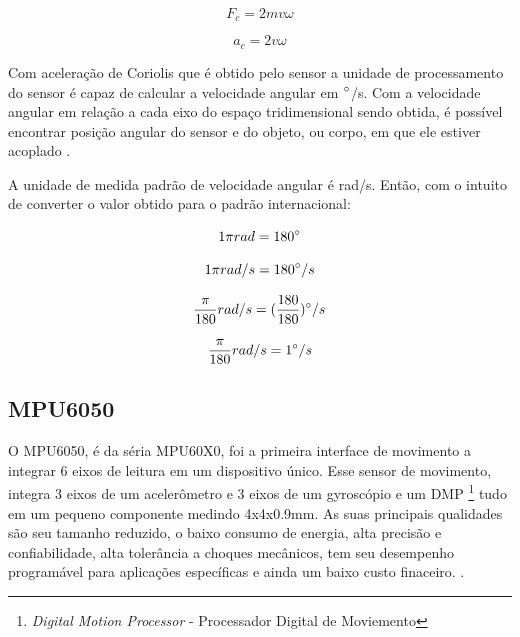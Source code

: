 			\begin{equation}
			F_{c} = 2mv\omega
			\end{equation}
			
			\begin{equation}
			a_{c} = 2v\omega
			\end{equation}
			
			Com aceleração de Coriolis que é obtido pelo sensor a unidade de processamento do sensor é capaz de calcular a velocidade angular em $\degree$/s. Com a velocidade angular em relação a cada eixo do espaço tridimensional sendo obtida, é possível encontrar posição angular do sensor e do objeto, ou corpo, em que ele estiver acoplado \cite{forhan2010}\cite{moyses2013}. 
			
			A unidade de medida padrão de velocidade angular  é rad/s. Então, com o intuito de converter o valor obtido para o padrão internacional:
			
			\begin{equation}
			1 \pi rad = 180\degree
			\end{equation}
			
			\begin{equation}
			1 \pi rad /s = 180\degree/s 
			\end{equation}
			
			\begin{equation}
			 \frac{\pi}{180} rad /s = (\frac{180}{180})\degree/s 
			\end{equation}
			
			\begin{equation}
			\frac{\pi}{180} rad /s = 1\degree/s 
			\end{equation}


\subsection{MPU6050}
	
	O MPU6050, é da séria MPU60X0, foi a primeira interface de movimento a integrar 6 eixos de leitura em um dispositivo único. Esse sensor de movimento, integra 3 eixos de um acelerômetro e 3 eixos de um gyroscópio e um DMP \footnote{\textit{Digital Motion Processor} - Processador Digital de Moviemento} tudo em um pequeno componente medindo 4x4x0.9mm. As suas principais qualidades são seu tamanho reduzido, o baixo consumo de energia, alta precisão e confiabilidade, alta tolerância a choques mecânicos, tem seu desempenho programável para aplicações específicas e ainda um baixo custo finaceiro. \cite{mpu6050}.
	
